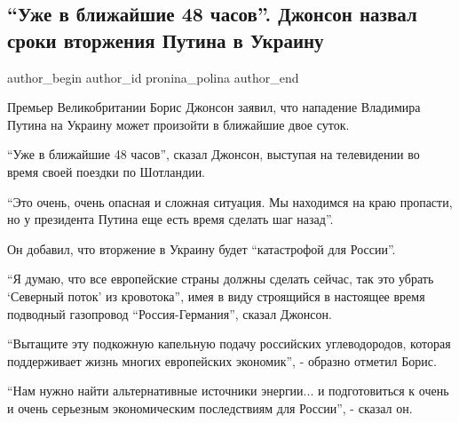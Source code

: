  
 
 
 
 
 
\subsection{\enquote{Уже в ближайшие 48 часов}. Джонсон назвал сроки вторжения Путина в Украину}
\label{sec:14_02_2022.stz.news.ua.strana.1.jonson_48_chasov}
 
\ifcmt
 author_begin
   author_id pronina_polina
 author_end
\fi

Премьер Великобритании Борис Джонсон заявил, что нападение Владимира Путина на
Украину может произойти в ближайшие двое суток.

\enquote{Уже в ближайшие 48 часов}, сказал Джонсон, выступая на телевидении во
время своей поездки по Шотландии.


\enquote{Это очень, очень опасная и сложная ситуация. Мы находимся на краю
пропасти, но у президента Путина еще есть время сделать шаг назад}.

Он добавил, что вторжение в Украину будет \enquote{катастрофой для России}.

\enquote{Я думаю, что все европейские страны должны сделать сейчас, так это убрать
\enquote{Северный поток} из кровотока}, имея в виду строящийся в настоящее
время подводный газопровод \enquote{Россия-Германия}, сказал Джонсон.

\enquote{Вытащите эту подкожную капельную подачу российских углеводородов,
которая поддерживает жизнь многих европейских экономик}, - образно отметил
Борис.

\enquote{Нам нужно найти альтернативные источники энергии... и подготовиться к
очень и очень серьезным экономическим последствиям для России}, - сказал он.

